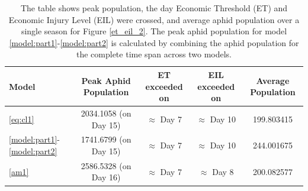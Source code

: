 \documentclass[sn-mathphys-num]{sn-jnl}
\numberwithin{equation}{section}
\numberwithin{equation}{section}
\begin{document}
\begin{table}
 \centering
\begin{tabular}{|l|c|c|c|c|}
\hline
\textbf{Model} & \textbf{Peak Aphid Population } & \textbf{ET exceeded on} & \textbf{EIL exceeded on} & \textbf{Average Population} \\
\hline
\eqref{eq:cl1}  & 2034.1058 (on Day 15)  & $\approx$ Day 7 &   $\approx$ Day 10 & 199.803415\\

 \hline
\eqref{model:part1}-\eqref{model:part2} & 1741.6799 (on Day 15)  & $\approx$ Day 7  & $\approx$ Day 10 & 244.001675 \\
 \hline
\eqref{am1} & 2586.5328 (on Day 16)  & $\approx$ Day 7  & $\approx$ Day 8 & 200.082577 
 \\
\hline
\end{tabular}
\caption{ The table shows peak population, the day Economic Threshold (ET) and Economic Injury Level (EIL) were crossed, and average aphid population over a single season for Figure \ref{et_eil_2}. The peak aphid population for model \eqref{model:part1}-\eqref{model:part2} is calculated by combining the aphid population for the complete time span across two models. }
\label{table:et_eil_levels_2}
\end{table}
\end{document}
